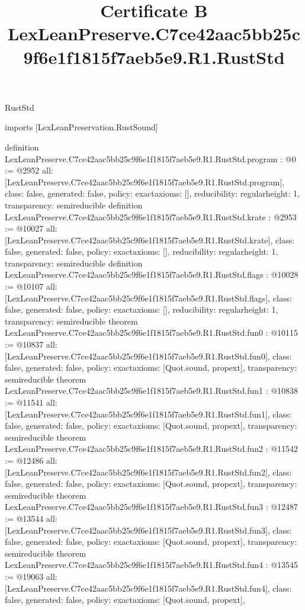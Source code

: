 \begin{lexlean}{RustStd}
\title{Certificate B LexLeanPreserve.C7ce42aac5bb25c9f6e1f1815f7aeb5e9.R1.RustStd}
\begin{coremodule}
imports [LexLeanPreservation.RustSound]

definition LexLeanPreserve.C7ce42aac5bb25c9f6e1f1815f7aeb5e9.R1.RustStd.program : @0 := @2952 {
  all: [LexLeanPreserve.C7ce42aac5bb25c9f6e1f1815f7aeb5e9.R1.RustStd.program],
  class: false,
  generated: false,
  policy: exact{axioms: []},
  reducibility: regular{height: 1},
  transparency: semireducible
}
definition LexLeanPreserve.C7ce42aac5bb25c9f6e1f1815f7aeb5e9.R1.RustStd.krate : @2953 := @10027 {
  all: [LexLeanPreserve.C7ce42aac5bb25c9f6e1f1815f7aeb5e9.R1.RustStd.krate],
  class: false,
  generated: false,
  policy: exact{axioms: []},
  reducibility: regular{height: 1},
  transparency: semireducible
}
definition LexLeanPreserve.C7ce42aac5bb25c9f6e1f1815f7aeb5e9.R1.RustStd.flags : @10028 := @10107 {
  all: [LexLeanPreserve.C7ce42aac5bb25c9f6e1f1815f7aeb5e9.R1.RustStd.flags],
  class: false,
  generated: false,
  policy: exact{axioms: []},
  reducibility: regular{height: 1},
  transparency: semireducible
}
theorem LexLeanPreserve.C7ce42aac5bb25c9f6e1f1815f7aeb5e9.R1.RustStd.fun0 : @10115 := @10837 {
  all: [LexLeanPreserve.C7ce42aac5bb25c9f6e1f1815f7aeb5e9.R1.RustStd.fun0],
  class: false,
  generated: false,
  policy: exact{axioms: [Quot.sound, propext]},
  transparency: semireducible
}
theorem LexLeanPreserve.C7ce42aac5bb25c9f6e1f1815f7aeb5e9.R1.RustStd.fun1 : @10838 := @11541 {
  all: [LexLeanPreserve.C7ce42aac5bb25c9f6e1f1815f7aeb5e9.R1.RustStd.fun1],
  class: false,
  generated: false,
  policy: exact{axioms: [Quot.sound, propext]},
  transparency: semireducible
}
theorem LexLeanPreserve.C7ce42aac5bb25c9f6e1f1815f7aeb5e9.R1.RustStd.fun2 : @11542 := @12486 {
  all: [LexLeanPreserve.C7ce42aac5bb25c9f6e1f1815f7aeb5e9.R1.RustStd.fun2],
  class: false,
  generated: false,
  policy: exact{axioms: [Quot.sound, propext]},
  transparency: semireducible
}
theorem LexLeanPreserve.C7ce42aac5bb25c9f6e1f1815f7aeb5e9.R1.RustStd.fun3 : @12487 := @13544 {
  all: [LexLeanPreserve.C7ce42aac5bb25c9f6e1f1815f7aeb5e9.R1.RustStd.fun3],
  class: false,
  generated: false,
  policy: exact{axioms: [Quot.sound, propext]},
  transparency: semireducible
}
theorem LexLeanPreserve.C7ce42aac5bb25c9f6e1f1815f7aeb5e9.R1.RustStd.fun4 : @13545 := @19063 {
  all: [LexLeanPreserve.C7ce42aac5bb25c9f6e1f1815f7aeb5e9.R1.RustStd.fun4],
  class: false,
  generated: false,
  policy: exact{axioms: [Quot.sound, propext]},
}
\end{coremodule}
\end{lexlean}
